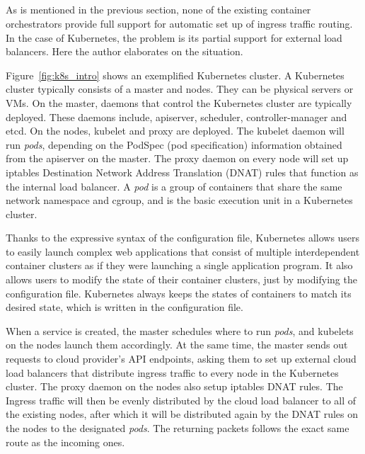 \subsection{}

As is mentioned in the previous section, none of the existing container orchestrators provide full support for automatic set up of ingress traffic routing.
In the case of Kubernetes, the problem is its partial support for external load balancers.
Here the author elaborates on the situation.

Figure~\ref{fig:k8s_intro} shows an exemplified Kubernetes cluster.
A Kubernetes cluster typically consists of a master and nodes. They can be physical servers or VMs.
On the master, daemons that control the Kubernetes cluster are typically deployed. 
These daemons include, apiserver, scheduler, controller-manager and etcd. 
On the nodes, kubelet and proxy are deployed.
The kubelet daemon will run {\it pods}, depending on the PodSpec (pod specification) information obtained from the apiserver on the master.
The proxy daemon on every node will set up iptables Destination Network Address Translation (DNAT) rules that function as the internal load balancer.
A {\em pod} is a group of containers that share the same network namespace and cgroup,
and is the basic execution unit in a Kubernetes cluster.

Thanks to the expressive syntax of the configuration file, Kubernetes allows users to easily launch complex web applications that consist of multiple interdependent container clusters as if they were launching a single application program.
It also allows users to modify the state of their container clusters, just by modifying the configuration file.
Kubernetes always keeps the states of containers to match its desired state, which is written in the configuration file.

When a service is created, the master schedules where to run {\em pods}, and kubelets on the nodes launch them accordingly.
At the same time, the master sends out requests to cloud provider's API endpoints, asking them to set up external cloud load balancers that distribute ingress traffic to every node in the Kubernetes cluster.
The proxy daemon on the nodes also setup iptables DNAT \cite{MartinA.Brown2017} rules. 
The Ingress traffic will then be evenly distributed by the cloud load balancer to all of the existing nodes, 
after which it will be distributed again by the DNAT rules on the nodes to the designated {\em pods}. 
The returning packets follows the exact same route as the incoming ones.

